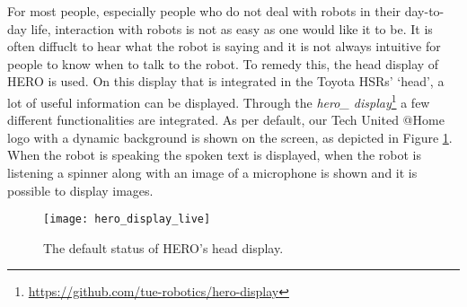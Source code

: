 \label{ssec:display}
For most people, especially people who do not deal with robots in their day-to-day life, interaction with robots is not as easy as one would like it to be. It is often diffuclt to hear what the robot is saying and it is not always intuitive for people to know when to talk to the robot. To remedy this, the head display of HERO is used. On this display that is integrated in the Toyota HSRs' `head', a lot of useful information can be displayed. Through the \emph{hero\_ display}\footnote{\url{https://github.com/tue-robotics/hero-display}} a few different functionalities are integrated. As per default, our Tech United @Home logo with a dynamic background is shown on the screen, as depicted in Figure \ref{fig:hero_display}. When the robot is speaking the spoken text is displayed, when the robot is listening a spinner along with an image of a microphone is shown and it is possible to display images.
\begin{figure}[H]
    \centering
	\texttt{[image: hero\_display\_live]}
	\caption{
		The default status of HERO's head display.}
	\label{fig:hero_display}
\end{figure}